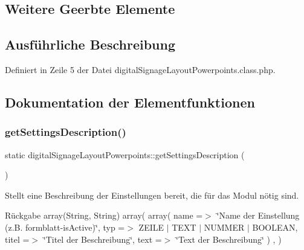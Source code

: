 \subsection*{Weitere Geerbte Elemente}


\subsection{Ausführliche Beschreibung}


Definiert in Zeile 5 der Datei digital\+Signage\+Layout\+Powerpoints.\+class.\+php.



\subsection{Dokumentation der Elementfunktionen}
\mbox{\label{classdigital_signage_layout_powerpoints_a0b9e5c7a160a90649ef49ad8e59e6694}} 
\subsubsection{\texorpdfstring{get\+Settings\+Description()}{getSettingsDescription()}}
{\footnotesize\ttfamily static digital\+Signage\+Layout\+Powerpoints\+::get\+Settings\+Description (\begin{DoxyParamCaption}{ }\end{DoxyParamCaption})\hspace{0.3cm}{\ttfamily [static]}}

Stellt eine Beschreibung der Einstellungen bereit, die für das Modul nötig sind. \begin{DoxyReturn}{Rückgabe}
array(\+String, String) array( array( \textquotesingle{}name\textquotesingle{} =$>$ \char`\"{}\+Name der Einstellung (z.\+B. formblatt-\/is\+Active)\char`\"{}, \textquotesingle{}typ\textquotesingle{} =$>$ Z\+E\+I\+LE $\vert$ T\+E\+XT $\vert$ N\+U\+M\+M\+ER $\vert$ B\+O\+O\+L\+E\+AN, \textquotesingle{}titel\textquotesingle{} =$>$ \char`\"{}\+Titel der Beschreibung\char`\"{}, \textquotesingle{}text\textquotesingle{} =$>$ \char`\"{}\+Text der Beschreibung\char`\"{} ) , ) 
\end{DoxyReturn}


